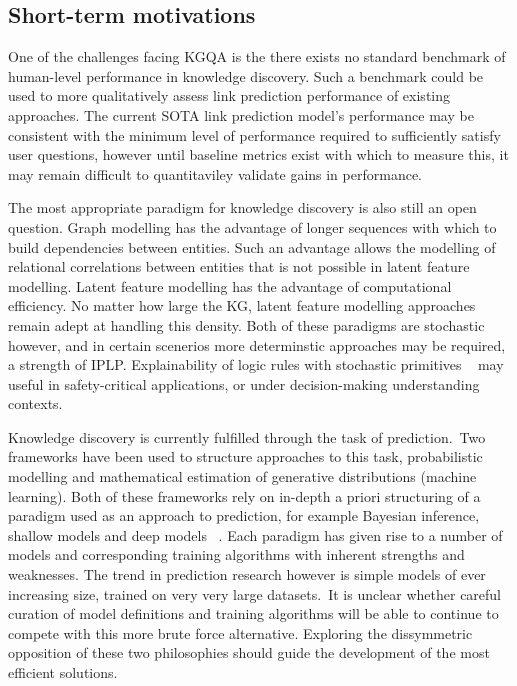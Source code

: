 \subsection{Short-term motivations}

One of the challenges facing KGQA is the there exists no standard benchmark of human-level performance in knowledge discovery. Such a benchmark could be used to more qualitatively assess link prediction performance of existing approaches. The current SOTA link prediction model's performance may be consistent with the minimum level of performance required to sufficiently satisfy user questions, however until baseline metrics exist with which to measure this, it may remain difficult to quantitaviley validate gains in performance. \par

\noindent The most appropriate paradigm for knowledge discovery is also still an open question. Graph modelling has the advantage of longer sequences with which to build dependencies between entities. Such an advantage allows the modelling of relational correlations between entities that is not possible in latent feature modelling. Latent feature modelling has the advantage of computational efficiency. No matter how large the KG, latent feature modelling approaches remain adept at handling this density. Both of these paradigms are stochastic however, and in certain scenerios more determinstic approaches may be required, a strength of IPLP. Explainability of logic rules with stochastic primitives \unskip~\citep{yang2017differentiable} may useful in safety-critical applications, or under decision-making understanding contexts. \par

\noindent Knowledge discovery is currently fulfilled through the task of prediction.\ Two frameworks have been used to structure approaches to this task, probabilistic modelling and mathematical estimation of generative distributions (machine learning). Both of these frameworks rely on in-depth a priori structuring of a paradigm used as an approach to prediction, for example Bayesian inference, shallow models and deep models \unskip~\citep{murphy2012machine}. Each paradigm has given rise to a number of models and corresponding training algorithms with inherent strengths and weaknesses. The trend in prediction research however is simple models of ever increasing size, trained on very very large datasets.\ It is unclear whether careful curation of model definitions and training algorithms will be able to continue to compete with this more brute force alternative. Exploring the dissymmetric opposition of these two philosophies should guide the development of the most efficient solutions.

